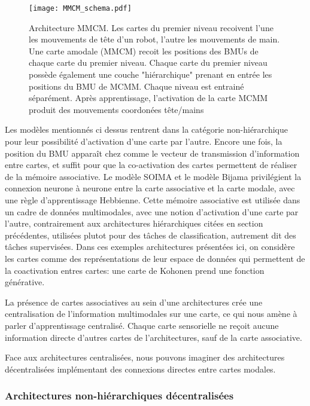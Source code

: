 \documentclass[../main]{subfiles}
\begin{document}
\begin{figure}
    \centering
    \texttt{[image: MMCM\_schema.pdf]}
    \caption{Architecture MMCM. Les cartes du premier niveau recoivent l'une les mouvements de tête d'un robot, l'autre les mouvements de main. 
    Une carte amodale (MMCM) recoit les positions des BMUs de chaque carte du premier niveau. Chaque carte du premier niveau possède également une couche "hiérarchique" prenant en entrée les positions du BMU de MCMM. Chaque niveau est entrainé séparément.
    Après apprentissage, l'activation de la carte MCMM produit des mouvements coordonées tête/mains~\cite{dominey13}\label{fig:mmcm}}
\end{figure}

Les modèles mentionnés ci dessus rentrent dans la catégorie non-hiérarchique pour leur possibilité d'activation d'une carte par l'autre. Encore une fois, la position du BMU apparaît chez \cite{dominey13} comme le vecteur de transmission d'information  entre cartes, et suffit pour que la co-activation des cartes permettent de réaliser de la mémoire associative. Le modèle SOIMA et le modèle Bijama privilégient la connexion neurone à neurone entre la carte associative et la carte modale, avec une règle d'apprentissage Hebbienne.
Cette mémoire associative est utilisée dans un cadre de données multimodales, avec une notion d'activation d'une carte par l'autre, contrairement aux architectures hiérarchiques citées en section précédentes, utilisées plutot pour des tâches de classification, autrement dit des tâches supervisées.
Dans ces exemples architectures présentées ici, on considère les cartes comme des représentations de leur espace de données qui permettent de la coactivation entres cartes: une carte de Kohonen prend une fonction générative.

La présence de cartes associatives au sein d'une architectures crée une centralisation de l'information multimodales sur une carte, ce qui nous amène à parler d'apprentissage centralisé. Chaque carte sensorielle ne reçoit aucune information directe d'autres cartes de l'architectures, sauf de la carte associative.

Face aux architectures centralisées, nous pouvons imaginer des architectures décentralisées implémentant des connexions directes entre cartes modales.

\subsubsection{Architectures non-hiérarchiques décentralisées}
\end{document}
